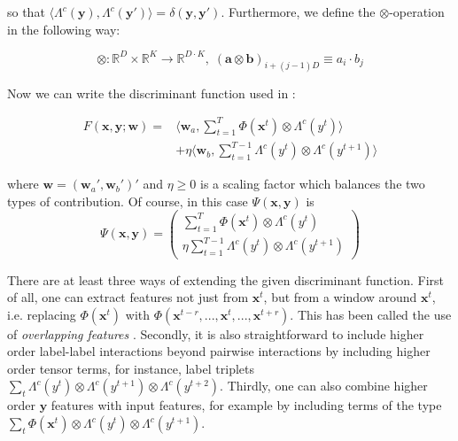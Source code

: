 so that $\langle \Lambda^c(\mathbf{y}),\Lambda^c(\mathbf{y}')\rangle =\delta(\mathbf{y},\mathbf{y}')$. Furthermore, we define the $\otimes$-operation in the following way:

\begin{equation}
\otimes:\mathbb{R}^D \times \mathbb{R}^K \rightarrow \mathbb{R}^{D\cdot K},\; (\mathbf{a}\otimes\mathbf{b})_{i+(j-1)D} \equiv a_i \cdot b_j
\end{equation}

Now we can write the discriminant function used in \cite{tsochantaridis2005large}:

\begin{eqnarray}
F(\mathbf{x},\mathbf{y};\mathbf{w}) = & \langle \mathbf{w}_a,\sum_{t=1}^T \Phi(\mathbf{x}^t) \otimes \Lambda^c(y^t) \rangle \nonumber \\
 & +\eta \langle \mathbf{w}_b,\sum_{t=1}^{T-1}  \Lambda^c(y^{t}) \otimes \Lambda^c(y^{t+1}) \rangle
\end{eqnarray}

where $\mathbf{w} = (\mathbf{w}_a',\mathbf{w}_b')'$ and $\eta \geq 0$ is a scaling factor which balances the two types of contribution. Of course, in this case $\Psi(\mathbf{x},\mathbf{y})$ is
\begin{equation}
\Psi(\mathbf{x},\mathbf{y}) = \left( \begin{array}{cc} \sum_{t=1}^T \Phi(\mathbf{x}^t) \otimes \Lambda^c(y^t) \\ \eta\sum_{t=1}^{T-1}  \Lambda^c(y^{t}) \otimes \Lambda^c(y^{t+1}) \end{array} \right)
\end{equation}

There are at least three ways of extending the given discriminant function. First of all, one can extract features not just from $\mathbf{x}^t$, but from a window around $\mathbf{x}^t$, i.e. replacing $\Phi(\mathbf{x}^t)$ with $\Phi(\mathbf{x}^{t-r},...,\mathbf{x}^t,...,\mathbf{x}^{t+r})$. This has been called the use of \textit{overlapping features} \cite{altun2003hidden}. Secondly, it is also straightforward to include higher order label-label interactions beyond pairwise interactions by including higher order tensor terms, for instance, label triplets $\sum_{t}  \Lambda^c(y^{t}) \otimes \Lambda^c(y^{t+1}) \otimes \Lambda^c(y^{t+2})$. Thirdly, one can also combine higher order $\mathbf{y}$ features with input features, for example by including terms of the type $\sum_{t} \Phi(\mathbf{x}^t) \otimes \Lambda^c(y^t) \otimes \Lambda^c(y^{t+1})$. 